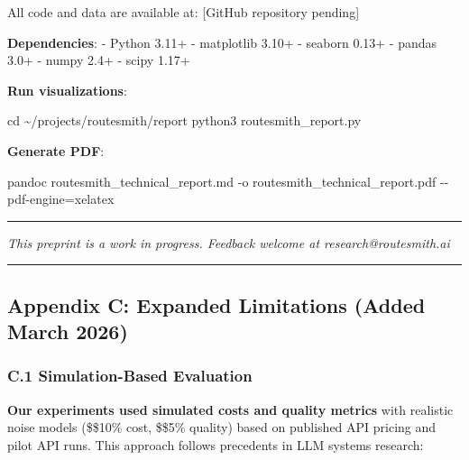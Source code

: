 \documentclass[
  11pt,
]{article}
\newenvironment{Shaded}{}{}
\newcommand{\AttributeTok}[1]{\textcolor[rgb]{0.49,0.56,0.16}{#1}}
\newcommand{\BuiltInTok}[1]{\textcolor[rgb]{0.00,0.50,0.00}{#1}}
\newcommand{\ExtensionTok}[1]{#1}
\newcommand{\NormalTok}[1]{#1}
\newcommand{\OperatorTok}[1]{\textcolor[rgb]{0.40,0.40,0.40}{#1}}
\begin{document}
All code and data are available at: {[}GitHub repository pending{]}

\textbf{Dependencies}: - Python 3.11+ - matplotlib 3.10+ - seaborn 0.13+
- pandas 3.0+ - numpy 2.4+ - scipy 1.17+

\textbf{Run visualizations}:

\begin{Shaded}
\begin{Highlighting}[]
\BuiltInTok{cd}\NormalTok{ \textasciitilde{}/projects/routesmith/report}
\ExtensionTok{python3}\NormalTok{ routesmith\_report.py}
\end{Highlighting}
\end{Shaded}

\textbf{Generate PDF}:

\begin{Shaded}
\begin{Highlighting}[]
\ExtensionTok{pandoc}\NormalTok{ routesmith\_technical\_report.md }\AttributeTok{{-}o}\NormalTok{ routesmith\_technical\_report.pdf }\AttributeTok{{-}{-}pdf{-}engine}\OperatorTok{=}\NormalTok{xelatex}
\end{Highlighting}
\end{Shaded}

\begin{center}\rule{0.5\linewidth}{0.5pt}\end{center}

\emph{This preprint is a work in progress. Feedback welcome at
research@routesmith.ai}

\begin{center}\rule{0.5\linewidth}{0.5pt}\end{center}

\hypertarget{appendix-c-expanded-limitations-added-march-2026}{%
\subsection{Appendix C: Expanded Limitations (Added March
2026)}\label{appendix-c-expanded-limitations-added-march-2026}}

\hypertarget{c.1-simulation-based-evaluation}{%
\subsubsection{C.1 Simulation-Based
Evaluation}\label{c.1-simulation-based-evaluation}}

\textbf{Our experiments used simulated costs and quality metrics} with
realistic noise models (\$\pm\$10\% cost, \$\pm\$5\% quality) based on
published API pricing and pilot API runs. This approach follows
precedents in LLM systems research:
\end{document}
